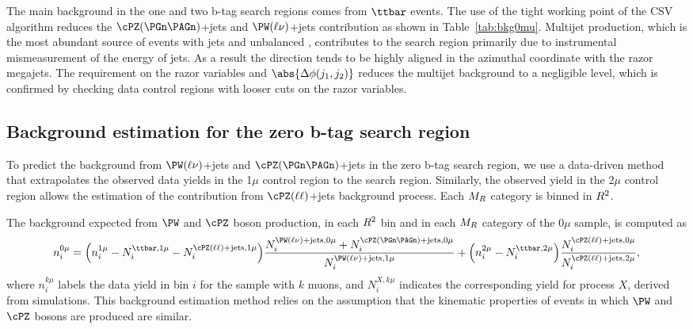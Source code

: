 The main background in the one and two b-tag search regions comes from $\ttbar$ events. 
The use of the tight working point of the CSV
algorithm reduces the $\cPZ(\PGn\PAGn)$+jets and $\PW(\ell\nu)$+jets contribution as
shown in Table~\ref{tab:bkg0mu}. Multijet production, which is the most abundant source of events with jets and
unbalanced \pt, contributes to the search region primarily due to 
instrumental mismeasurement of the energy of jets. As a result the
\MET direction tends to be highly aligned in the azimuthal coordinate with
the razor megajets. The requirement on the razor variables and 
$\abs{ \Delta\phi (j_{1}, j_{2})}$ reduces the multijet
background to a negligible level, which is confirmed by checking 
data control regions with looser cuts on the razor variables.

\subsection{Background estimation for the zero b-tag search region} 
\label{sec:bkgzmu}

To predict the background from $\PW(\ell\nu)$+jets and $\cPZ(\PGn\PAGn)$+jets in 
the zero b-tag search region, we use a data-driven method that extrapolates
the observed data yields in the 1$\mu$ control region to the search region.
Similarly, the observed yield in the 2$\mu$ control region allows the estimation of
the contribution from $\cPZ(\ell \ell)$+jets background process. Each
$M_R$ category is binned in $R^2$. 

The background expected from $\PW$ and $\cPZ$ boson production, in
each $R^2$ bin and in each $M_R$ category of the 0$\mu$
sample, is computed as
\begin{equation}
  n_{i}^{0\mu} =  \Bigl(n_{i}^{1\mu} - N_{i}^{\ttbar,1\mu} - N_{i}^{\cPZ(\ell
    \ell)+\text{jets},1\mu}\Bigr) \frac{N_{i}^{\PW(\ell\nu)+\text{jets},0\mu}+N_{i}^{\cPZ(\PGn\PAGn)+\text{jets},0\mu}}{N_{i}^{\PW(\ell\nu)+\text{jets},1\mu}} +
\Bigl(n_{i}^{2\mu} - N_{i}^{\ttbar,2\mu}\Bigr) \frac{N_{i}^{\cPZ(\ell \ell)+\text{jets},0\mu}}{N_{i}^{\cPZ(\ell \ell)+\text{jets},2\mu}},
\label{eqn:pred}
\end{equation}
where $n_{i}^{k\mu}$ labels the data yield in bin $i$ for the sample
with $k$ muons, and $N_{i}^{X,k\mu}$ indicates the corresponding yield
for process $X$, derived from simulations. This background estimation method relies on 
the assumption that the kinematic properties of events in which $\PW$ and $\cPZ$ bosons are
produced are similar.

